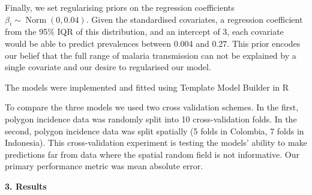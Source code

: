 \documentclass[11pt]{article}
\begin{document}
Finally, we set regularising priors on the regression coefficients $\beta_i \sim \operatorname{ Norm}(0, 0.04)$. 
Given the standardised covariates, a regression coefficient from the 95\% IQR of this distribution, and an intercept of 3, each covariate would be able to predict prevalences between 0.004 and 0.27. 
This prior encodes our belief that the full range of malaria transmission can not be explained by a single covariate and our desire to regularised our model.

The models were implemented and fitted using Template Model Builder \cite{TMB} in R \cite{R}

To compare the three models we used two cross validation schemes. 
In the first, polygon incidence data was randomly split into 10 cross-validation folds.
In the second, polygon incidence data was split spatially (5 folds in Colombia, 7 folds in Indonesia).
This cross-validation experiment is testing the models’ ability to make predictions far from data where the spatial random field is not informative.
Our primary performance metric was mean absolute error.


{\bf 3. Results}
\end{document}
